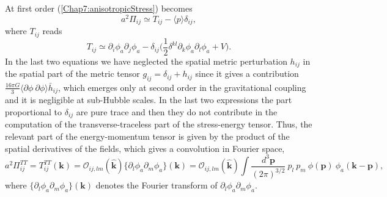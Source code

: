 \documentclass[11pt,a4paper,twoside]{book}
\begin{document}
At first order (\ref{Chap7:anisotropicStress}) becomes
\begin{equation}
\label{Chap7:anisotropicStressDelta}
a^{2}\Pi_{ij}\simeq T_{ij}-\langle p\rangle \delta_{ij},
\end{equation}
where $ T_{ij} $ reads
\begin{equation}
\label{Chap7:stressEnergyTensorDelta}
T_{ij}\simeq\partial_{i}\phi_{a}\partial_{j}\phi_{a} - \delta_{ij}\Bigg(\frac{1}{2}\delta^{kl}\partial_{k}\phi_{a}\partial_l \phi_{a} + V \Bigg).
\end{equation}
In the last two equations we have neglected the spatial metric perturbation $ h_{ij} $ in the spatial part of the metric tensor $ g_{ij}=\delta_{ij}+ h_{ij} $ since it gives a contribution $ \frac{16\pi G}{3}\langle \partial \phi\ \partial \phi \rangle  \bar{h}_{ij} $, which emerges only at second order in the gravitational coupling and it is negligible at sub-Hubble scales. In the last two expressions the part proportional to $\delta_{ij}$ are pure trace and then they do not contribute in the computation of the transverse-traceless part of the stress-energy tensor. Thus, the relevant part of the energy-momentum tensor is given by the product of the spatial derivatives of the fields, which gives a convolution in Fourier space,
\begin{equation}
\label{Chap7:stressEnergyTensor}
a^{2}\Pi^{TT}_{ij}=T^{TT}_{ij}(\textbf{k})=\mathcal{O}_{ij,lm}(\hat{\textbf{k}}) \{\partial_{l}\phi_{a}\partial_{m}\phi_{a}\} (\textbf{k}) = \mathcal{O}_{ij,lm}(\hat{\textbf{k}}) \int \frac{d^{3}\textbf{p}}{(2\pi)^{3/2}}\ p_{l}\  p_{m}\ \phi(\textbf{p})\ \phi_{a}(\textbf{k} - \textbf{p}),
\end{equation}
where $ \{\partial_{l}\phi_{a}\partial_{m}\phi_{a}\}(\textbf{k}) $ denotes the Fourier transform of $ \partial_{l}\phi_{a}\partial_{m}\phi_{a} $.
\end{document}
